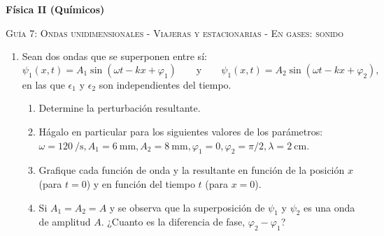 \documentclass[11pt,spanish,a4paper]{article}
\begin{document}
\noindent
\textbf{Física II (Químicos)}\hfill {}
\begin{center}
  \textsc{\large Guía 7: Ondas unidimensionales - Viajeras y estacionarias - En gases: sonido}
\par\end{center}{\large \par}


\begin{enumerate}

\section*{Viajeras y estacionarias}



\item
Sean dos ondas que se superponen entre sí:
	\[
	\psi_1(x,t)= A_1 \sin \left( \omega t - k x + \varphi_1 \right) \qquad \mathrm{y} \qquad \psi_1(x,t)= A_2 \sin \left( \omega t - k x + \varphi_2 \right), 
	\]
en las que \( \epsilon_1 \) y \( \epsilon_2 \) son independientes del tiempo.
    \begin{enumerate}
        \item Determine la perturbación resultante.
		\item Hágalo en particular para los siguientes valores de los parámetros: \( \omega=\SI{120}{\per\second}, A_1=\SI{6}{\milli\metre}, A_2=\SI{8}{\milli\metre}, \varphi_1= 0, \varphi_2= \pi/2, \lambda= \SI{2}{\centi\metre}\).
		\item Grafique cada función de onda y la resultante en función de la posición \(x\) (para \(t=0\)) y en función del tiempo \(t\) (para \(x=0\)).
		\item Si \(A_1= A_2= A\) y se observa que la superposición de \(\psi_1\) y \(\psi_2\) es una onda de amplitud \(A\). ¿Cuanto es la diferencia de fase, \(\varphi_2 - \varphi_1\)?
    \end{enumerate}



\end{enumerate}
\end{document}

